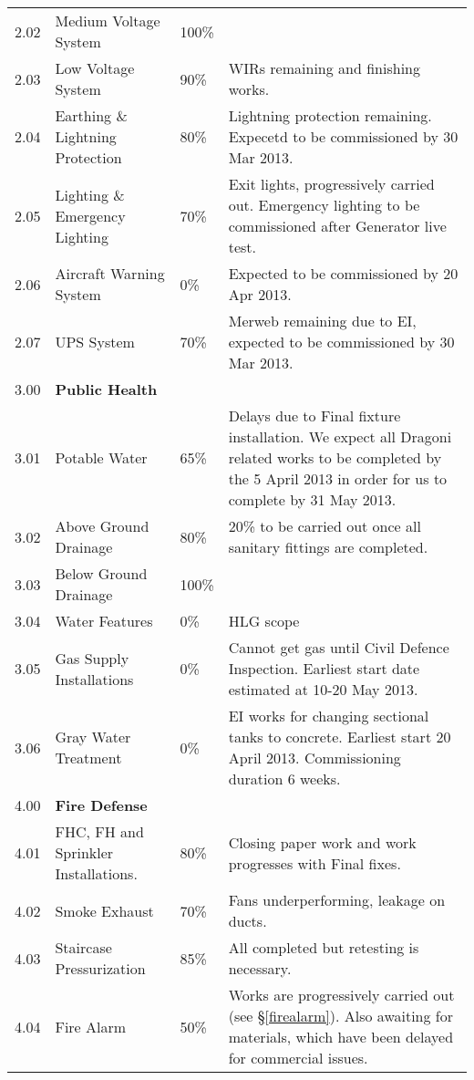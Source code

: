 {\begin{longtable}{lllp{5.3cm}@{}}
2.02	&Medium Voltage System	&100\%&\\	

2.03	&Low Voltage System		&90\%&WIRs remaining and finishing works.\\

2.04	&Earthing \& Lightning Protection &80\%&Lightning protection remaining. Expecetd to be commissioned by 30 Mar 2013.\\		

2.05	&Lighting \& Emergency Lighting  &70\%& Exit lights, progressively carried out. Emergency lighting to be commissioned after Generator live test.\\		

2.06	&Aircraft Warning System &0\%& Expected to be commissioned by 20 Apr 2013.\\	
	
2.07	&UPS System	&70\%&  Merweb remaining due to EI, expected to be commissioned by 30 Mar 2013.\\	
\midrule
3.00	&\textbf{Public Health}		&&\\
3.01	&Potable Water	&65\%& Delays due to Final fixture installation. We expect all Dragoni related works to be completed by the 5 April 2013 in order for us to complete by 31 May 2013.\\	

3.02	&Above Ground Drainage &80\%&20\% to be carried out once all sanitary fittings are completed.\\		
3.03	&Below Ground Drainage  &100\%&\\		
3.04	&Water Features	     &0\%& HLG scope\\	
3.05	&Gas Supply Installations	&0\%& Cannot get gas until Civil Defence Inspection. Earliest start date estimated at 10-20 May 2013.\\	
3.06  & Gray Water Treatment &0\% &EI works for changing sectional tanks to concrete. Earliest start 20 April 2013. Commissioning duration 6 weeks. \\
\midrule		
4.00	&\textbf{Fire Defense} &&\\	
4.01	&FHC, FH and Sprinkler Installations.	&80\%&Closing paper work and work progresses with Final fixes.\\	
4.02	&Smoke Exhaust		&70\%&Fans underperforming, leakage on ducts. \\
4.03	&Staircase Pressurization          &85\%&All completed but retesting is necessary.\\		
4.04	&Fire Alarm		&50\%& Works are progressively carried out (see \S\ref{firealarm}). Also awaiting for materials, which have been delayed for commercial issues.\\


\end{longtable}}
